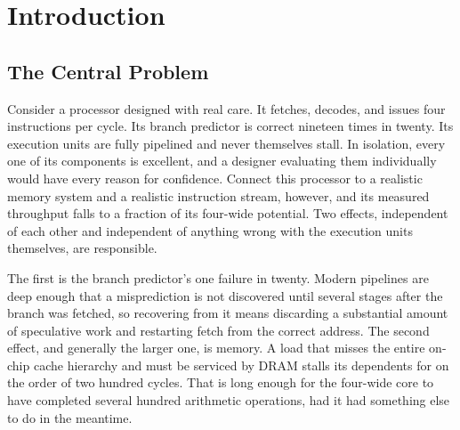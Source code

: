 \documentclass[11pt,a4paper]{report}
\begin{document}
\begin{abstract}
Taken together, these three perspectives show that processor
performance is not determined by execution units, memory technology, or
compiler decisions in isolation. It emerges from the interaction
between them, with each layer compensating for limitations that remain
at the others. The paper therefore treats modern computer architecture
as a coordinated hardware--software system whose performance depends on
how effectively these layers work together.
\end{abstract}


\tableofcontents
\listoffigures
\listoftables

\chapter{Introduction}
\label{ch:intro}

\section{The Central Problem}
\label{sec:central-problem}

Consider a processor designed with real care. It fetches, decodes, and
issues four instructions per cycle. Its branch predictor is correct
nineteen times in twenty. Its execution units are fully pipelined and
never themselves stall. In isolation, every one of its components is
excellent, and a designer evaluating them individually would have every
reason for confidence. Connect this processor to a realistic memory
system and a realistic instruction stream, however, and its measured
throughput falls to a fraction of its four-wide potential. Two effects,
independent of each other and independent of anything wrong with the
execution units themselves, are responsible.

The first is the branch predictor's one failure in twenty. Modern
pipelines are deep enough that a misprediction is not discovered until
several stages after the branch was fetched, so recovering from it means
discarding a substantial amount of speculative work and restarting fetch
from the correct address. The second effect, and generally the larger
one, is memory. A load that misses the entire on-chip cache hierarchy
and must be serviced by DRAM stalls its dependents for on the order of
two hundred cycles. That is long enough for the four-wide core to have
completed several hundred arithmetic operations, had it had something
else to do in the meantime.
\end{document}
